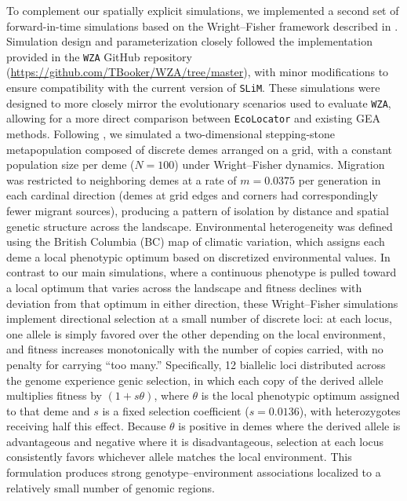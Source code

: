 \documentclass[]{article}
\newcommand{\ecolocator}{\texttt{EcoLocator}\xspace}
\newcommand{\slim}{\texttt{SLiM}\xspace}
\begin{document}
To complement our spatially explicit simulations,
we implemented a second set of forward-in-time simulations
based on the Wright--Fisher framework
described in \citet{booker_wza_2024}.
Simulation design and parameterization closely followed
the implementation provided in the \texttt{WZA} GitHub repository
(\url{https://github.com/TBooker/WZA/tree/master}),
with minor modifications to ensure compatibility
with the current version of \slim.
These simulations were designed to more closely mirror
the evolutionary scenarios used to evaluate \texttt{WZA},
allowing for a more direct comparison
between \ecolocator and existing GEA methods.
Following \citet{booker_wza_2024},
we simulated a two-dimensional stepping-stone metapopulation
composed of discrete demes arranged on a grid,
with a constant population size per deme ($N=100$)
under Wright--Fisher dynamics.
Migration was restricted to neighboring demes at a rate of
$m=0.0375$ per generation in each cardinal direction
(demes at grid edges and corners had correspondingly fewer
migrant sources), producing a pattern of isolation by distance
and spatial genetic structure across the landscape.
Environmental heterogeneity was defined
using the British Columbia (BC) map of climatic variation,
which assigns each deme a local phenotypic optimum
based on discretized environmental values.
In contrast to our main simulations,
where a continuous phenotype is pulled toward a local optimum 
that varies across the landscape and fitness declines with deviation 
from that optimum in either direction,
these Wright--Fisher simulations implement directional selection
at a small number of discrete loci:
at each locus, one allele is simply favored over the other 
depending on the local environment, 
and fitness increases monotonically with the number of copies carried, 
with no penalty for carrying ``too many.''
Specifically, 12 biallelic loci distributed across the genome
experience genic selection,
in which each copy of the derived allele 
multiplies fitness by $(1 + s\theta)$, 
where $\theta$ is the local phenotypic optimum assigned to that
deme and $s$ is a fixed selection coefficient ($s=0.0136$), with
heterozygotes receiving half this effect.
Because $\theta$ is positive in demes where the 
derived allele is advantageous and negative where it is 
disadvantageous, selection at each locus consistently 
favors whichever allele matches the local environment.
This formulation produces strong genotype--environment associations
localized to a relatively small number of genomic regions.
\end{document}
